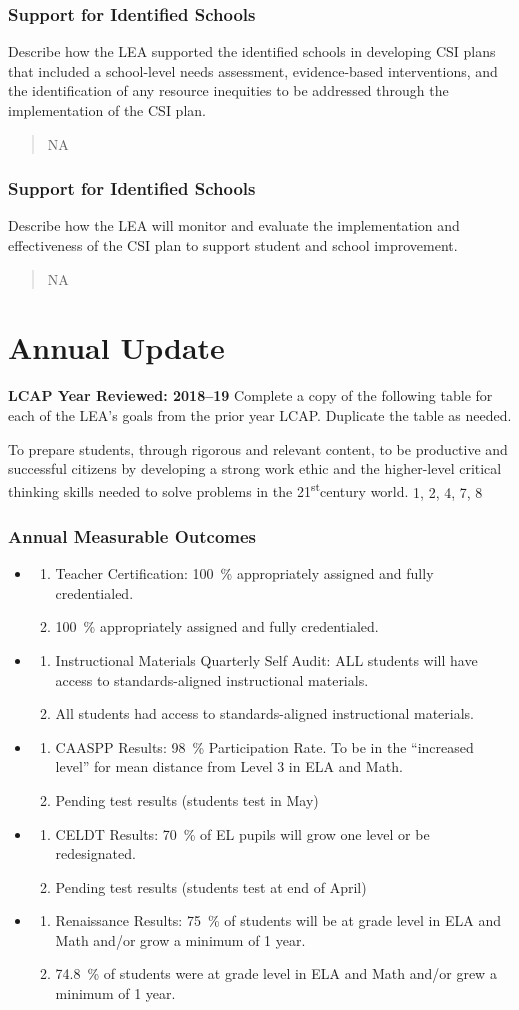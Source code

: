 \documentclass{article}
\makeatletter
\newcommand{\st}{\textsuperscript{st}}
\newcounter{goal}[section] %
\newcommand*{\expact}[1]{%
	\expandafter\@expact\csname c@#1\endcsname%
}
\newcommand*{\@expact}[1]{%
	$\ifcase\intcalcAdd{1}{\intcalcMod{\intcalcSub{#1}{1}}{2}}
		\or{\text{Expected:}}
		\or{\text{Actual:}}
    \else\@ctrerr\fi$
}
\newcommand{\outcome}[2]{
	\item
	\begin{enumerate}[label=\expact*]
	\setlength{\itemsep}{0pt}
	\item #1
	\item #2
	\end{enumerate}
}
\newenvironment{outcomes}
	{
		\subsubsection{Annual Measurable Outcomes}
		\begin{itemize}[label={}]
	}
	{\end{itemize}}
\makeatother
\begin{document}
\subsubsection{Support for Identified Schools}
Describe how the LEA supported the identified schools in developing CSI plans that included a school-level needs assessment, evidence-based interventions, and the identification of any resource inequities to be addressed through the implementation of the CSI plan.
\begin{quote}
	NA
\end{quote}

\subsubsection{Support for Identified Schools}
Describe how the LEA will monitor and evaluate the implementation and effectiveness of the CSI plan to support student and school improvement.
\begin{quote}
	NA
\end{quote}

\section{Annual Update}
{\bf LCAP Year Reviewed: 2018--19}\newline
Complete a copy of the following table for each of the LEA's goals from the prior year LCAP. Duplicate the table as needed.

\Goal %
	{To prepare students, through rigorous and relevant content, to be productive and successful citizens by developing a strong work ethic and the higher-level critical thinking skills needed to solve problems in the 21\st century world.}
	{1, 2, 4, 7, 8}
	{}

\begin{outcomes}
	\outcome
		{Teacher Certification: \SI{100}{\percent} appropriately assigned and fully credentialed.}
		{\SI{100}{\percent} appropriately assigned and fully credentialed.}
	\outcome
		{Instructional Materials Quarterly Self Audit: ALL students will have access to standards-aligned instructional materials.}
		{All students had access to standards-aligned instructional materials.}
	\outcome
		{CAASPP Results: \SI{98}{\percent} Participation Rate. To be in the ``increased level'' for mean distance from Level 3 in ELA and Math.}
		{Pending test results (students test in May)}
	\outcome
		{CELDT Results: \SI{70}{\percent} of EL pupils will grow one level or be re\-designated.}
		{Pending test results (students test at end of April)}
	\outcome
		{Renaissance Results: \SI{75}{\percent} of students will be at grade level in ELA and Math and/or grow a minimum of 1 year.}
		{\SI{74.8}{\percent} of students were at grade level in ELA and Math and/or grew a minimum of 1 year.}
\end{outcomes}
\end{document}
